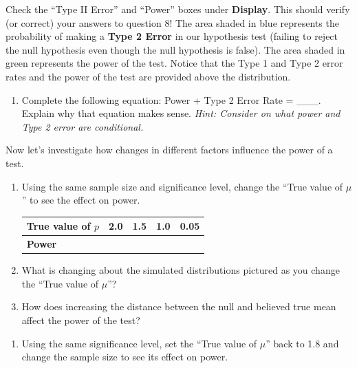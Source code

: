 \documentclass[
]{report}
\providecommand{\tightlist}{%
  \setlength{\itemsep}{0pt}\setlength{\parskip}{0pt}}
\begin{document}
Check the ``Type II Error'' and ``Power'' boxes under \textbf{Display}. This should verify (or correct) your answers to question 8! The area shaded in blue represents the probability of making a \textbf{Type 2 Error} in our hypothesis test (failing to reject the null hypothesis even though the null hypothesis is false). The area shaded in green represents the power of the test. Notice that the Type 1 and Type 2 error rates and the power of the test are provided above the distribution.

\begin{enumerate}
\def\labelenumi{\arabic{enumi}.}
\setcounter{enumi}{8}
\tightlist
\item
  Complete the following equation: Power + Type 2 Error Rate = \_\_\_. Explain why that equation makes sense. \emph{Hint: Consider on what power and Type 2 error are conditional.}
  \vspace{0.6in}
\end{enumerate}

Now let's investigate how changes in different factors influence the power of a test.

\begin{enumerate}
\def\labelenumi{\arabic{enumi}.}
\setcounter{enumi}{9}
\item
  Using the same sample size and significance level, change the ``True value of \(\mu\)'' to see the effect on power.
  \setlength\tabcolsep{0.5cm}

  \begin{longtable}{|l|c|c|c|c|}
  \hline
  \textbf{True value of $p$}& 2.0 & 1.5 & 1.0 & 0.05\\ \hline
  \textbf{Power} & & & &  \\ \hline
  \end{longtable}
\item
  What is changing about the simulated distributions pictured as you change the ``True value of \(\mu\)''?
  \vspace{0.6in}
\item
  How does increasing the distance between the null and believed true mean affect the power of the test?
  \vspace{0.6in}
\end{enumerate}

\newpage

\begin{enumerate}
\def\labelenumi{\arabic{enumi}.}
\setcounter{enumi}{12}
\tightlist
\item
  Using the same significance level, set the ``True value of \(\mu\)'' back to 1.8 and change the sample size to see its effect on power.
\end{enumerate}
\end{document}
